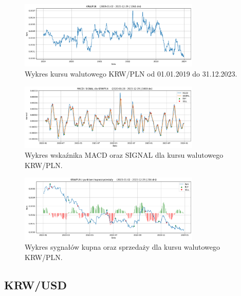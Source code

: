 \documentclass[12pt, a4paper]{article}
\begin{document}
\begin{figure}[ht]
    \centering
    \includegraphics[width=0.77\textwidth]{krw_pln_value.png}
    \caption{Wykres kursu walutowego KRW/PLN od 01.01.2019 do 31.12.2023.}
    \label{fig:all:krw_pln_value}
\end{figure}
\begin{figure}[ht]
    \centering
    \includegraphics[width=0.77\textwidth]{krw_pln_macd_signal.png}
    \caption{Wykres wskaźnika MACD oraz SIGNAL dla kursu walutowego KRW/PLN.}
    \label{fig:all:krw_pln_macd_signal}
\end{figure}
\begin{figure}[ht]
    \centering
    \includegraphics[width=0.77\textwidth]{krw_pln_value_buy_sell.png}
    \caption{Wykres sygnałów kupna oraz sprzedaży dla kursu walutowego KRW/PLN.}
    \label{fig:all:krw_pln_value_buy_sell}
\end{figure}

\pagebreak







\subsection{KRW/USD}
\end{document}
